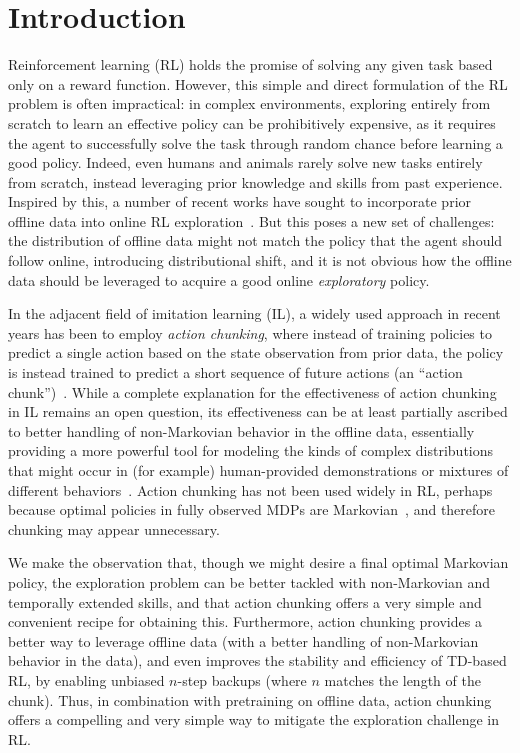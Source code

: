 

\section{Introduction}
\label{sec:intro}
Reinforcement learning (RL) holds the promise of solving any given task based only on a reward function. However, this simple and direct formulation of the RL problem is often impractical: in complex environments, exploring entirely from scratch to learn an effective policy can be prohibitively expensive, as it requires the agent to successfully solve the task through random chance before learning a good policy. Indeed, even humans and animals rarely solve new tasks entirely from scratch, instead leveraging prior knowledge and skills from past experience. Inspired by this, a number of recent works have sought to incorporate prior offline data into online RL exploration~\citep{hu2023unsupervised, li2024accelerating, wilcoxson2024leveraging}.
But this poses a new set of challenges: the distribution of offline data might not match the policy that the agent should follow online, introducing distributional shift, and it is not obvious how the offline data should be leveraged to acquire a good online \emph{exploratory} policy.

In the adjacent field of imitation learning (IL), a widely used approach in recent years has been to employ \emph{action chunking}, where instead of training policies to predict a single action based on the state observation from prior data, the policy is instead trained to predict a short sequence of future actions (an ``action chunk'')~\citep{zhao2023learning, chi2023diffusion}. While a complete explanation for the effectiveness of action chunking in IL remains an open question, its effectiveness can be at least partially ascribed to better handling of non-Markovian behavior in the offline data, essentially providing a more powerful tool for modeling the kinds of complex distributions that might occur in (for example) human-provided demonstrations or mixtures of different behaviors~\citep{zhao2023learning}. Action chunking has not been used widely in RL, perhaps because optimal policies in fully observed MDPs are Markovian~\citep{sutton1998reinforcement}, and therefore chunking may appear unnecessary.

We make the observation that, though we might desire a final optimal Markovian policy, the exploration problem can be better tackled with non-Markovian and temporally extended skills, and that action chunking offers a very simple and convenient recipe for obtaining this. Furthermore, action chunking provides a better way to leverage offline data (with a better handling of non-Markovian behavior in the data), and even improves the stability and efficiency of TD-based RL, by enabling unbiased $n$-step backups (where $n$ matches the length of the chunk). Thus, in combination with pretraining on offline data, action chunking offers a compelling and very simple way to mitigate the exploration challenge in RL.


